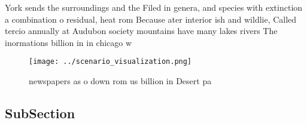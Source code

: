 \documentclass[a4paper]{article}
\begin{document}
York sends the surroundings and the Filed in genera, and species with extinction a combination o residual, heat rom Because ater interior ish and wildlie, Called tercio annually at Audubon society mountains have many lakes rivers The inormations billion in in chicago w

\begin{figure}
\centering
\texttt{[image: ../scenario\_visualization.png]}
\caption{ newspapers as o down rom us billion in Desert pa
}
\end{figure}
 
\subsection{SubSection}
\end{document}
